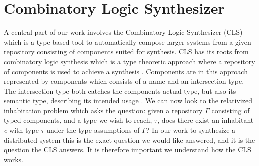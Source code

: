 \section{Combinatory Logic Synthesizer}
A central part of our work involves the Combinatory Logic Synthesizer (CLS) which is a type based tool to automatically compose larger systems from a given repository consisting of components suited for synthesis. CLS has its roots from combinatory logic synthesis which is a type theoretic approach where a repository of components is used to achieve a synthesis \cite{CLSPaper}. Components are in this approach represented by components which consists of a name and an intersection type. The intersection type both catches the components actual type, but also its semantic type, describing its intended usage \cite{CLSPaper}. We can now look to the relativized inhabitation problem which asks the question: given a repository $\Gamma$ consisting of typed components, and a type we wish to reach, $\tau$, does there exist an inhabitant \textit{e} with type $\tau$ under the type assumptions of $\Gamma$? \cite{CLSPaper} In our work to synthesize a distributed system this is the exact question we would like answered, and it is the question the CLS answers. It is therefore important we understand how the CLS works.

